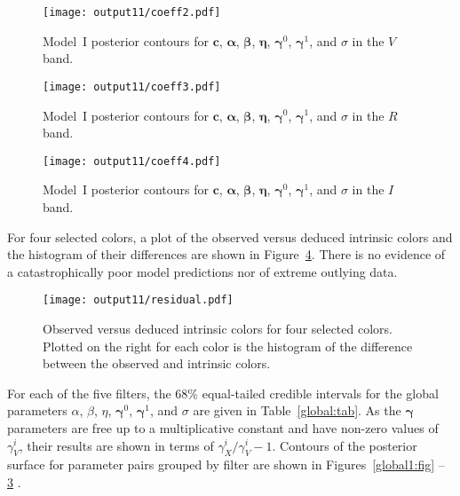 \documentclass{aastex61}   	%
\begin{document}
\begin{figure}[htbp] %
   \centering
   \texttt{[image: output11/coeff2.pdf]} 
            \caption{Model~I posterior contours for $\mathbf{c}$, $\pmb{\alpha}$, $\pmb{\beta}$, $\pmb{\eta}$, $\pmb{\gamma}^0$, $\pmb{\gamma}^1$, and $\sigma$ in the $V$ band.
 \label{global3:fig}}
\end{figure}

\begin{figure}[htbp] %
   \centering
      \texttt{[image: output11/coeff3.pdf]} 
            \caption{Model~I posterior contours for  $\mathbf{c}$, $\pmb{\alpha}$, $\pmb{\beta}$, $\pmb{\eta}$,  $\pmb{\gamma}^0$, $\pmb{\gamma}^1$, and $\sigma$ in the $R$ band.
 \label{global4:fig}}
\end{figure}

\begin{figure}[htbp] %
   \centering
         \texttt{[image: output11/coeff4.pdf]} 
            \caption{Model~I posterior contours for  $\mathbf{c}$, $\pmb{\alpha}$, $\pmb{\beta}$, $\pmb{\eta}$, $\pmb{\gamma}^0$, $\pmb{\gamma}^1$, and $\sigma$ in the $I$ band.
 \label{global5:fig}}
\end{figure}



\color{purple}
For four selected colors, a plot of the
observed versus deduced intrinsic colors and the histogram of their differences
\color{black}
are shown in Figure~\ref{residual:fig}. 
There is no evidence of a catastrophically poor model predictions nor of extreme
outlying data.

\begin{figure}[htbp] %
   \centering
   \texttt{[image: output11/residual.pdf]} 
            \caption{
            \color{purple}
            Observed versus deduced intrinsic colors for four selected colors.  Plotted on the right for each color
is the histogram of the difference between the observed and intrinsic colors.
\color{black}
            \label{residual:fig}}
\end{figure}


For each of the five filters, the 68\%  equal-tailed credible intervals for the global parameters $\alpha$, $\beta$, $\eta$, $\pmb{\gamma}^0$, $\pmb{\gamma}^1$, and $\sigma$
are given in Table~\ref{global:tab}.
As the $\pmb{\gamma}$ parameters are free up to a multiplicative constant and have non-zero values of $\gamma^i_V$,
their results are shown in terms of $\gamma^i_X/\gamma^i_V-1$.
Contours of the posterior surface for parameter pairs grouped by filter are shown in Figures~\ref{global1:fig} -- \ref{global5:fig} .
\end{document}
